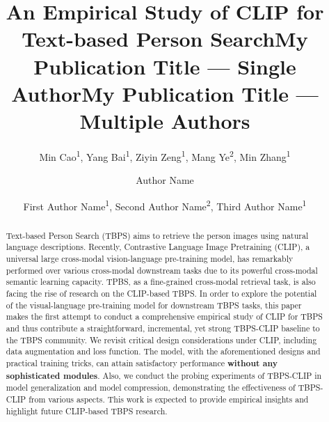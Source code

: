 \documentclass[letterpaper]{article} %
\title{An Empirical Study of CLIP for Text-based Person Search}
\author{
    Min Cao\textsuperscript{\rm 1},
    Yang Bai\textsuperscript{\rm 1},
    Ziyin Zeng\textsuperscript{\rm 1},
    Mang Ye\textsuperscript{\rm 2},
    Min Zhang\textsuperscript{\rm 1}
}
\title{My Publication Title --- Single Author}
\author {
    Author Name
}
\title{My Publication Title --- Multiple Authors}
\author {
    First Author Name\textsuperscript{\rm 1},
    Second Author Name\textsuperscript{\rm 2},
    Third Author Name\textsuperscript{\rm 1}
}
\begin{document}
\maketitle

\begin{abstract}
Text-based Person Search (TBPS) aims to retrieve the person images using natural language descriptions. 
Recently, Contrastive Language Image Pretraining (CLIP), a universal large cross-modal vision-language pre-training model, has remarkably performed over various cross-modal downstream tasks due to its powerful cross-modal semantic learning capacity. TPBS, as a fine-grained cross-modal retrieval task, is also facing the rise of research on the CLIP-based TBPS. 
In order to explore the potential of the visual-language pre-training model for downstream TBPS tasks, this paper makes the first attempt to conduct a comprehensive empirical study of CLIP for TBPS and thus contribute a straightforward, incremental, yet strong TBPS-CLIP baseline to the TBPS community.
We revisit critical design considerations under CLIP, including data augmentation and loss function.
The model, with the aforementioned designs and practical training tricks, can attain satisfactory performance \textbf{without any sophisticated modules}. Also, we conduct the probing experiments of TBPS-CLIP in model generalization and model compression, demonstrating the effectiveness of TBPS-CLIP from various aspects.
This work is expected to provide empirical insights and highlight future CLIP-based TBPS research.



\end{abstract}
\end{document}
